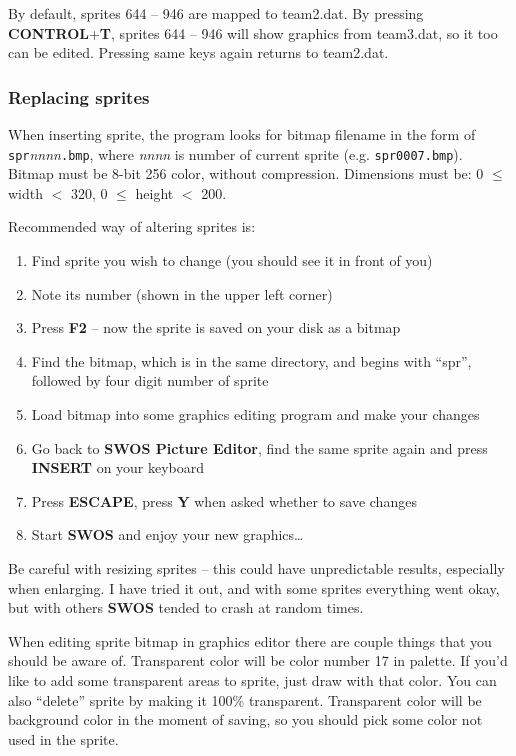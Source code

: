 \documentclass[a4paper,12pt]{article}
\begin{document}
By default, sprites 644 -- 946 are mapped to team2.dat. By pressing
{\bf CONTROL}+{\bf T}, sprites 644 -- 946 will show graphics from team3.dat, so it too
can be edited. Pressing same keys again returns to team2.dat.

\subsubsection{Replacing sprites}

When inserting sprite, the program looks for bitmap filename in the form of \verb|spr|{\it nnnn}\verb|.bmp|, where
{\it nnnn} is number of current sprite (e.g. \verb|spr0007.bmp|). Bitmap must be 8-bit 256 color,
without compression. Dimensions must be: 0 $\le$ width $<$ 320, 0 $\le$ height
$<$ 200.

Recommended way of altering sprites is:

\begin{enumerate}
\item Find sprite you wish to change (you should see it in front of you)
\item Note its number (shown in the upper left corner)
\item Press {\bf F2} -- now the sprite is saved on your disk as a bitmap
\item Find the bitmap, which is in the same directory, and begins with ``spr'',
followed by four digit number of sprite
\item Load bitmap into some graphics editing program and make your changes
\item Go back to {\bf SWOS Picture Editor}, find the same sprite again and press
{\bf INSERT} on your keyboard
\item Press {\bf ESCAPE}, press {\bf Y} when asked whether to save changes
\item Start {\bf SWOS} and enjoy your new graphics\ldots
\end{enumerate}

Be careful with resizing sprites -- this could have unpredictable results,
especially when enlarging. I have tried it out, and with some sprites
everything went okay, but with others {\bf SWOS} tended to crash at random times.

When editing sprite bitmap in graphics editor there are couple things that you
should be aware of. Transparent color will be color number 17 in palette. If
you'd like to add some transparent areas to sprite, just draw with that color.
You can also ``delete'' sprite by making it 100\% transparent. Transparent
color will be background color in the moment of saving, so you should pick some
color not used in the sprite.
\end{document}
